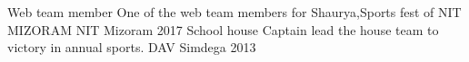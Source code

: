 \begin{cvhonors}
  \cvhonor
    {Web team member}
    {One of the web team members for Shaurya,Sports fest of NIT MIZORAM}
    {NIT Mizoram}
    {2017}
  \cvhonor
    {School house Captain}
    {lead the house team to victory in annual sports.}
    {DAV Simdega}
    {2013}
\end{cvhonors}
